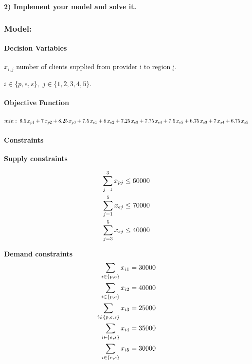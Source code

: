 \documentclass[]{article}
\let\oldparagraph\paragraph
\renewcommand{\paragraph}[1]{\oldparagraph{#1}\mbox{}}
\begin{document}
\textbf{2) Implement your model and solve it.}

\hypertarget{model-1}{%
\subsubsection{Model:}\label{model-1}}

\hypertarget{decision-variables}{%
\paragraph{Decision Variables}\label{decision-variables}}

\(x_{i,j}\) number of clients supplied from provider i to region j.

\(i \in \{p,e,s\},\) \(j \in \{1,2,3,4,5\}\).

\hypertarget{objective-function}{%
\paragraph{Objective Function}\label{objective-function}}

\[   min: \;  6.5\,x_{p1} + 7\,x_{p2} + 8.25 \,x_{p3}\\ 
 + 7.5 \,x_{e1} + 8 \,x_{e2} + 7.25 \,x_{e3} + 7.75 \,x_{e4} + 7.5 \,x_{e5}\\
+ 6.75 \,x_{s3} + 7 \,x_{s4} + 6.75 \,x_{s5}\]

\hypertarget{constraints}{%
\paragraph{Constraints}\label{constraints}}

\textbf{Supply constraints}

\[\begin{align}
\sum_{j=1}^{3} x_{pj} \le 60000\\ 
\sum_{j=1}^{5} x_{ej} \le 70000\\
\sum_{j=3}^{5} x_{sj} \le 40000\\
\end{align}\\\]

\textbf{Demand constraints} \[\begin{align}
\sum_{i \in \{p,e\}} x_{i1} = 30000\\
\sum_{i \in \{p,e\}} x_{i2} = 40000\\
\sum_{i \in \{p,e,s\}} x_{i3} = 25000\\
\sum_{i \in \{e,s\}} x_{i4} = 35000\\
\sum_{i \in \{e,s\}} x_{i5} = 30000\\
\end{align}\\\]
\end{document}

